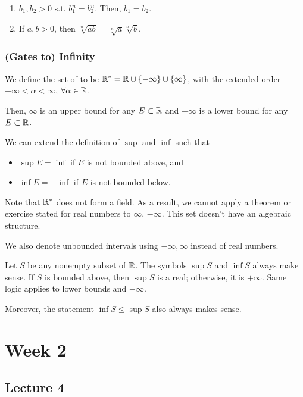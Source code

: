 \documentclass{book}
\begin{document}
\begin{corollary}
    \begin{enumerate}
        \item $b_1, b_2 > 0$ s.t. $b_1^n = b_2^n$. Then, $b_1 = b_2$.
        \item If $a, b > 0$, then $\sqrt[n]{ab} = \sqrt[n]{a}  \sqrt[n]{b}$.
    \end{enumerate}
\end{corollary}

\subsection{(Gates to) Infinity}
We define the set of  to be $\mathbb{R}^* = \mathbb{R} \cup \{-\infty\} \cup \{\infty\}$, with the extended order $-\infty < \alpha < \infty$, $\forall \alpha \in \mathbb{R}$.

Then, $\infty$ is an upper bound for any $E \subset \mathbb{R}$ and $-\infty$ is a lower bound for any $E \subset \mathbb{R}$. 

We can extend the definition of $\sup$ and $\inf$ such that
\begin{itemize}
    \item $\sup E = \inf$ if $E$ is not bounded above, and 
    \item $\inf E = -\inf$ if $E$ is not bounded below.
\end{itemize}

Note that $\mathbb{R}^*$ does not form a field. As a result, we cannot apply a theorem or exercise stated for real numbers to $\infty$, $-\infty$. This set doesn't have an algebraic structure.

We also denote unbounded intervals using $-\infty, \infty$ instead of real numbers.

\begin{remark}
    Let $S$ be any nonempty subset of $\mathbb{R}$. The symbols $\sup S$ and $\inf S$ always make sense. If $S$ is bounded above, then $\sup S$ is a real; otherwise, it is $+\infty$. Same logic applies to lower bounds and $-\infty$.

    Moreover, the statement $\inf S \leq \sup S$ also always makes sense.
\end{remark}

\chapter{Week 2}
\section{Lecture 4}
\end{document}
